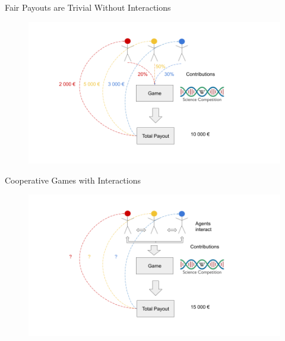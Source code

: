 \documentclass[11pt,compress,t,notes=noshow, aspectratio=169, xcolor=table]{beamer}
\begin{document}
\begin{vbframe}{Fair Payouts are Trivial Without Interactions}

\begin{figure}
    \centering
    \includegraphics{figure/Shapley_2.png}
\end{figure}

\end{vbframe}
\begin{vbframe}{Cooperative Games with Interactions}

\begin{figure}
    \centering
    \includegraphics{figure/Shapley_3.png}
\end{figure}

\end{vbframe}
\end{document}
